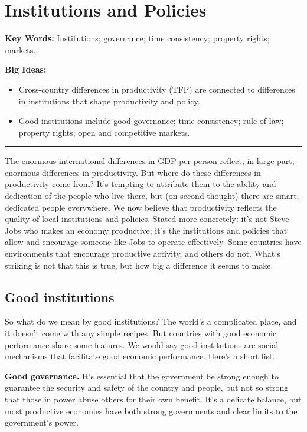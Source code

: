 \chapter{Institutions and Policies}\label{chp:insp}
\hypertarget{institutions}{}

\textbf{Key Words:} Institutions; governance; time consistency; property rights; markets.

\textbf{Big Ideas:}
\vspace{-0.1in}
\begin{itemize}
\item Cross-country differences in productivity (TFP)
  are connected to differences in institutions that shape productivity and policy.
\item  Good institutions include good governance; time consistency; rule of law; property rights; open and competitive markets.
\end{itemize}
\rule{\textwidth}{1pt}

The enormous international differences in GDP per person
reflect, in large part, enormous differences in
productivity.
But where do these differences in productivity come from?
It's tempting to attribute them to the ability and dedication
of the people who live there,
but (on second thought) there are smart, dedicated people everywhere.
We now believe that productivity reflects
the quality of local institutions and policies.
Stated more concretely:
it's not Steve Jobs who makes an economy productive;
it's the institutions and policies that allow and encourage someone like Jobs to
operate effectively.
Some countries have environments that encourage productive
activity, and others do not.
What's striking is not that this is true,
but how big a difference it seems to make.


\section{Good institutions}

So what do we mean by good institutions?
The world's a complicated place, and it doesn't come
with any simple recipes.
But countries with good economic performance
 share some features.
We would say good institutions are social mechanisms
that facilitate good economic performance. Here's a short list.

\textbf{Good governance.}
It's essential that the government be strong enough
to guarantee the security and safety of the country
and people,
but not so strong that those in power abuse others for their own benefit.
It's a delicate balance,
but most productive economies have both strong governments
and clear limits to the government's power.

